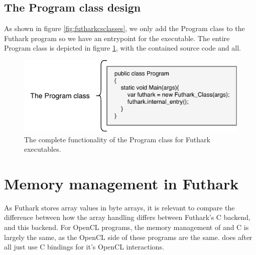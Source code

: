 \clearpage

\subsection{The Program class design}
\label{subsec:programclass}
As shown in figure \ref{fig:futharkcsclasses}, we only add the Program class to
the Futhark program so we have an entrypoint for the executable.
The entire Program class is depicted in figure \ref{fig:programclass}, with the
contained source code and all.

\begin{figure}[H]
  \centering
  \includegraphics{chapters/figs/csharp/program_class.pdf}
  \caption{The complete functionality of the Program class for Futhark
    executables.}
  \label{fig:programclass}
\end{figure}

\section{Memory management in Futhark \csharp{}}
As Futhark stores array values in byte arrays, it is relevant to compare
the difference between how the array handling differs between Futhark's C
backend, and this \csharp{} backend.
For OpenCL programs, the memory management of \csharp{} and C is largely the
same, as the OpenCL side of these programs are the same. \csharp{} does after
all just use C bindings for it's OpenCL interactions.


